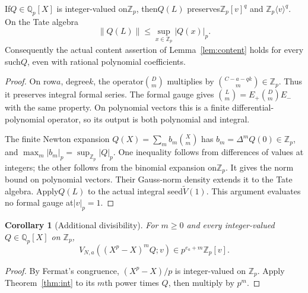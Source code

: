 \documentclass[11pt]{article}
\newtheorem{corollary}[lemma]{Corollary}
\begin{document}
\begin{theorem}\label{thm:int}
If$Q\in\mathbb Q_p[X]$ is integer-valued on$\mathbb Z_p$,
then$Q(L)$ preserves$\mathbb Z_p[v]^q$ and
$\mathbb Z_p\langle v\rangle^q$. On the Tate algebra
\[
 \|Q(L)\|\le\sup_{x\in\mathbb Z_p}|Q(x)|_p.
\]
Consequently the actual content assertion of
Lemma~\ref{lem:content} holds for every such$Q$, even with
rational polynomial coefficients.
\end{theorem}
\begin{proof}
On row$a$, degree$k$, the operator$\binom Dm$ multiplies by
$\binom{C-a-qk}{m}\in\mathbb Z_p$.
Thus it preserves integral formal series.
The formal gauge gives
$\binom Lm=E_+\binom Dm E_-$ with the same property.
On polynomial vectors this is a finite differential-polynomial
operator, so its output is both polynomial and integral.

The finite Newton expansion
$Q(X)=\sum_m b_m\binom Xm$ has
$b_m=\Delta^mQ(0)\in\mathbb Z_p$, and
$\max_m|b_m|_p=\sup_{\mathbb Z_p}|Q|_p$.
One inequality follows from differences of values at integers;
the other follows from the binomial expansion on$\mathbb Z_p$.
It gives the norm bound on polynomial vectors.
Their Gauss-norm density extends it to the Tate algebra.
Apply$Q(L)$ to the actual integral seed$\widetilde V(1)$.
This argument evaluates no formal gauge at$|v|_p=1$.
\end{proof}

\begin{corollary}[Additional divisibility]\label{cor:extra-content}
For $m\ge0$ and every integer-valued $Q\in\mathbb Q_p[X]$ on $\mathbb Z_p$,
\[
 V_{N,a}((X^p-X)^m Q;v)\in p^{e_a+m}\mathbb Z_p[v].
\]
\end{corollary}
\begin{proof}
By Fermat's congruence, $(X^p-X)/p$ is integer-valued on $\mathbb Z_p$.
Apply Theorem~\ref{thm:int} to its $m$th power times $Q$, then
multiply by $p^m$.
\end{proof}
\end{document}
